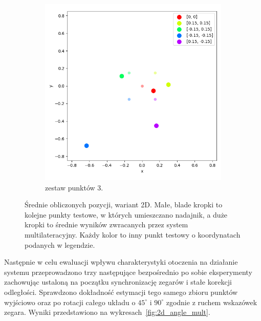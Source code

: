 \begin{figure}[H]
    \ContinuedFloat\centering
    \begin{subfigure}{.5\textwidth}
        \centering
        \includegraphics[width=\linewidth]{pics/mult_lat_2d/positions_3_mean.png}
        \caption{zestaw punktów 3.}
        \label{pic:2d_3_mult}
    \end{subfigure}
    \caption[Wyniki eksperymentu dla wersji 2D]{Średnie obliczonych pozycji, wariant 2D. Małe, blade kropki to kolejne punkty testowe, w których umieszczano nadajnik, a duże kropki to średnie wyników zwracanych przez system multilateracyjny. Każdy kolor to inny punkt testowy o koordynatach podanych w legendzie.}
    \label{fig:2d_mult}
\end{figure}

Następnie w celu ewaluacji wpływu charakterystyki otoczenia na działanie systemu przeprowadzono trzy następujące bezpośrednio po sobie eksperymenty zachowując ustaloną na początku synchronizację zegarów i stałe korekcji odległości. Sprawdzono dokładność estymacji tego samego zbioru punktów wyjściowo oraz po rotacji całego układu o $45^{\circ}$ i $90^{\circ}$ zgodnie z ruchem wskazówek zegara. Wyniki przedstawiono na wykresach~\ref{fig:2d_angle_mult}. 

